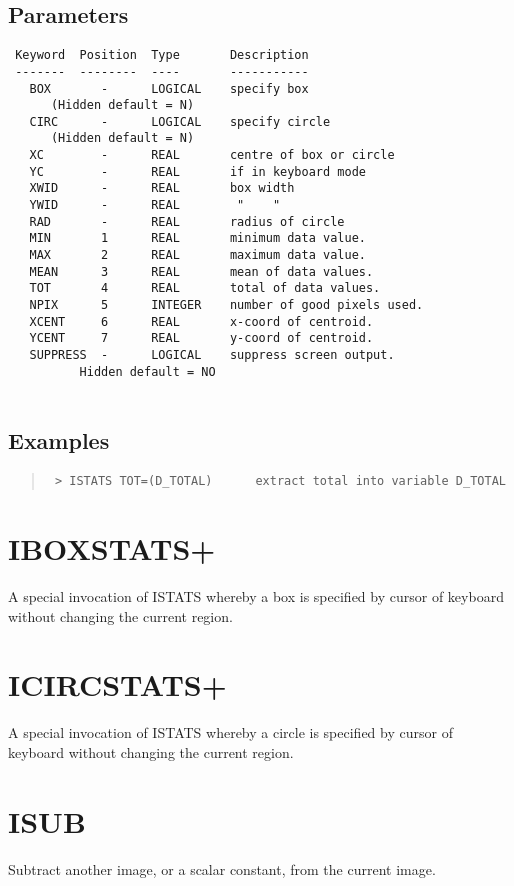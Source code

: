\documentclass{book}
\renewcommand{\_}{{\tt\char'137}}     %
\begin{document}
\subsection{Parameters}
\begin{verbatim}
 Keyword  Position  Type       Description
 -------  --------  ----       -----------
   BOX       -      LOGICAL    specify box
      (Hidden default = N)
   CIRC      -      LOGICAL    specify circle
      (Hidden default = N)
   XC        -      REAL       centre of box or circle
   YC        -      REAL       if in keyboard mode
   XWID      -      REAL       box width
   YWID      -      REAL        "    "
   RAD       -      REAL       radius of circle
   MIN       1      REAL       minimum data value.
   MAX       2      REAL       maximum data value.
   MEAN      3      REAL       mean of data values.
   TOT       4      REAL       total of data values.
   NPIX      5      INTEGER    number of good pixels used.
   XCENT     6      REAL       x-coord of centroid.
   YCENT     7      REAL       y-coord of centroid.
   SUPPRESS  -      LOGICAL    suppress screen output.
          Hidden default = NO
 
\end{verbatim}\subsection{Examples}
\begin{quote}\begin{verbatim}
 > ISTATS TOT=(D_TOTAL)      extract total into variable D_TOTAL
 \end{verbatim}\end{quote}
\section{IBOXSTATS+}
A special invocation of ISTATS whereby a box is specified
by cursor of keyboard without changing the current region.
 
\section{ICIRCSTATS+}
A special invocation of ISTATS whereby a circle is specified
by cursor of keyboard without changing the current region.
 
\section{ISUB}
Subtract another image, or a scalar constant, from the current
image.
 
\end{document}
